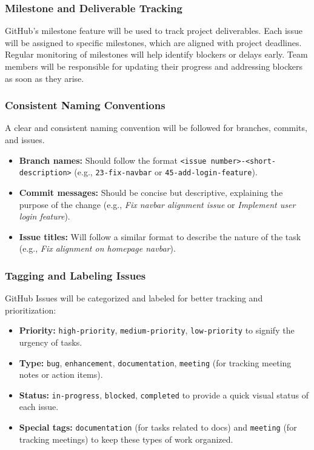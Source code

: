 \documentclass{article}
\begin{document}
\subsubsection{Milestone and Deliverable Tracking} 
GitHub's milestone feature will be used to track project deliverables. Each issue will be assigned to specific milestones, which are aligned with project deadlines. Regular monitoring of milestones will help identify blockers or delays early. Team members will be responsible for updating their progress and addressing blockers as soon as they arise.

\subsubsection{Consistent Naming Conventions} 
A clear and consistent naming convention will be followed for branches, commits, and issues.
\begin{itemize}
    \item \textbf{Branch names:} Should follow the format \texttt{<issue number>-<short-description>} (e.g., \texttt{23-fix-navbar} or \texttt{45-add-login-feature}).
    \item \textbf{Commit messages:} Should be concise but descriptive, explaining the purpose of the change (e.g., \textit{Fix navbar alignment issue} or \textit{Implement user login feature}).
    \item \textbf{Issue titles:} Will follow a similar format to describe the nature of the task (e.g., \textit{Fix alignment on homepage navbar}).
\end{itemize}

\subsubsection{Tagging and Labeling Issues} 
GitHub Issues will be categorized and labeled for better tracking and prioritization:
\begin{itemize}
    \item \textbf{Priority:} \texttt{high-priority}, \texttt{medium-priority}, \texttt{low-priority} to signify the urgency of tasks.
    \item \textbf{Type:} \texttt{bug}, \texttt{enhancement}, \texttt{documentation}, \texttt{meeting} (for tracking meeting notes or action items).
    \item \textbf{Status:} \texttt{in-progress}, \texttt{blocked}, \texttt{completed} to provide a quick visual status of each issue.
    \item \textbf{Special tags:} \texttt{documentation} (for tasks related to docs) and \texttt{meeting} (for tracking meetings) to keep these types of work organized.
\end{itemize}
\end{document}
